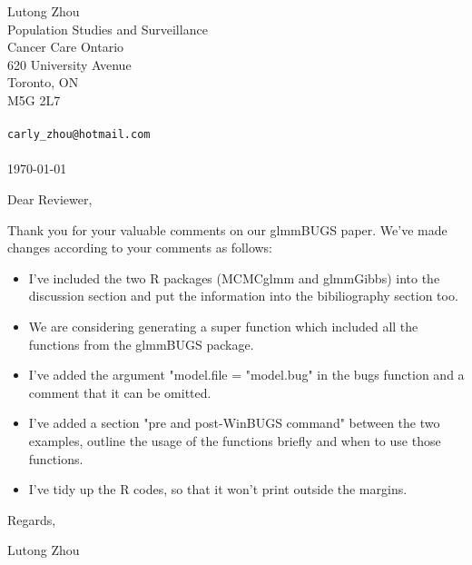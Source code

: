 \documentclass[12pt]{article}
\begin{document}
\thispagestyle{empty}

\vspace*{10pt}

{\flushright

\begin{minipage}{3in}
Lutong Zhou\\ Population  Studies and Surveillance\\
Cancer Care Ontario\\ 620 University Avenue\\Toronto, ON\\M5G 2L7\\
\\
{\tt carly\_zhou@hotmail.com}
\\ \\
\today
\end{minipage}

}

\vspace{10pt}

\noindent Dear Reviewer, 

\vspace{10pt}

Thank you for your valuable comments on our glmmBUGS paper. We've made changes according to your comments as follows:

\begin{itemize}
\item I've included the two R packages (MCMCglmm and glmmGibbs) into the discussion section and put the information into the bibiliography section too.

\item We are considering generating a super function which included all the functions from the glmmBUGS package.  

\item I've added the argument "model.file = "model.bug" in the bugs function and a comment that it can be omitted.

\item I've added a section "pre and post-WinBUGS command" between the two examples, outline the usage of the functions briefly and when to use those functions.

\item  I've tidy up the R codes, so that it won't print outside the margins.
\end{itemize}


{\flushleft

\begin{minipage}{3in}
\vspace{10pt}
Regards,

\vspace{10pt}

Lutong Zhou

\end{minipage}

}
\end{document}
